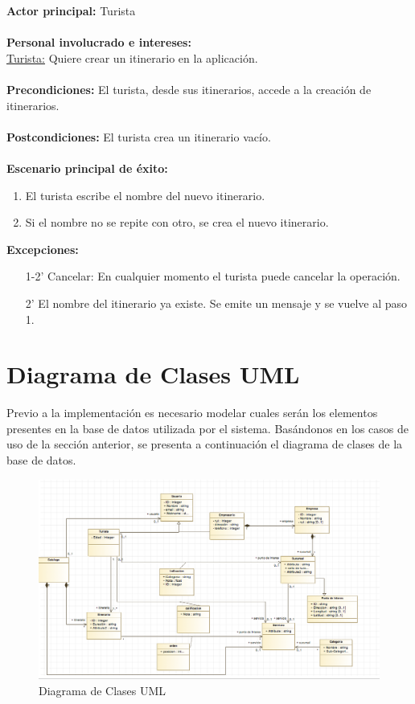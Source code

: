 \documentclass[12pt]{article}
\begin{document}
\textbf{Actor principal:} Turista\\
\\
\textbf{Personal involucrado e intereses: }\\\underline{Turista:} Quiere crear un itinerario en la aplicación.\\
\\
\textbf{Precondiciones:} El turista, desde sus itinerarios, accede a la creación de itinerarios.\\
\\
\textbf{Postcondiciones:} El turista crea un itinerario vacío.\\
\\
\textbf{Escenario principal de éxito:}
\\
\begin{enumerate}
\item El turista escribe el nombre del nuevo itinerario.
\item Si el nombre no se repite con otro, se crea el nuevo itinerario.
\end{enumerate}
\textbf{Excepciones:}
\begin{enumerate}
\item[1-2'] Cancelar: En cualquier momento el turista puede cancelar la operación.
\item[2'] El nombre del itinerario ya existe. Se emite un mensaje y se vuelve al paso 1.
\end{enumerate}
\section{Diagrama de Clases UML}
Previo a la implementación es necesario modelar cuales serán los elementos presentes en la base de datos utilizada por el sistema. Basándonos en los casos de uso de la sección anterior, se presenta a continuación el diagrama de clases de la base de datos.\\
\begin{figure}[htp]
\centering
\includegraphics[scale=0.6, angle=90]{Informe/dcfinal.png}
\caption{Diagrama de Clases UML}
\label{}
\end{figure}
\newpage
\end{document}
